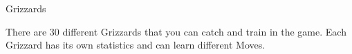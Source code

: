 \documentclass[10pt,twocolumn]{memoir}
\begin{document}
\newenvironment{grizzardpage}[6]{{%

    \vfill
  \section{#1}\label{grizzard:#1}

  Grizzard number: #2

  \subsection*{Starting Stats}

  \begin{description}
  \item[Attack]
    #4
  \item[Defend]
    #5
  \item[Maximum Hit Points]
    #3
  \end{description}

  \subsection*{Moves}

  See page~\pageref{sec:GrizzardMoves} for a guide to all the Grizzards' moves.

  \subsection*{Metamorphosis}

  \ifx\relax\detokenize{#6}\relax {

    #1 does not metamorphose (it is a final form).

  }\else {

    #1 will metamorphose into  #6 (see page~\pageref{grizzard:#6}) after
    gaining 27 experience points.

  }\fi

  \subsection*{Description}

}{}}

\chapter{Grizzards}

There  are 30  different  Grizzards  that you  can  catch  and train  in
the  game.  Each   Grizzard  has  its  own  statistics   and  can  learn
different Moves. 
\end{document}
